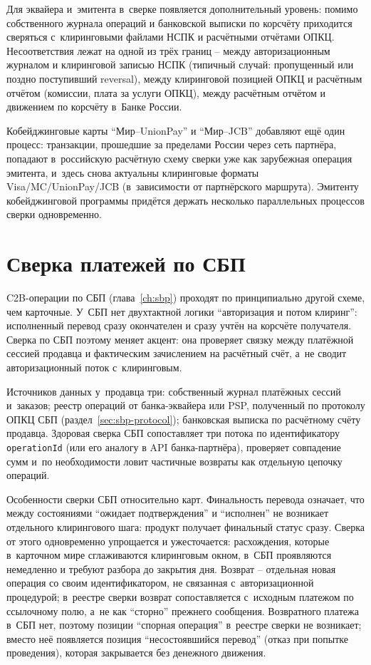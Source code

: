 Для эквайера и~эмитента в~сверке появляется
дополнительный уровень: помимо собственного журнала операций
и банковской выписки по корсчёту приходится сверяться с~клиринговыми
файлами НСПК и расчётными отчётами ОПКЦ. Несоответствия
лежат на одной из трёх границ -- между авторизационным
журналом и клиринговой записью НСПК (типичный случай:
пропущенный или поздно поступивший reversal), между клиринговой
позицией ОПКЦ и расчётным отчётом (комиссии, плата за услуги
ОПКЦ), между расчётным отчётом и движением по корсчёту
в~Банке России.

Кобейджинговые карты \enquote{Мир--UnionPay} и \enquote{Мир--JCB}
добавляют ещё один процесс: транзакции, прошедшие за пределами
России через сеть партнёра, попадают в~российскую расчётную схему
сверки уже как зарубежная операция эмитента, и~здесь снова
актуальны клиринговые форматы Visa/MC/UnionPay/JCB
(в~зависимости от партнёрского маршрута). Эмитенту
кобейджинговой программы придётся держать несколько
параллельных процессов сверки одновременно.

\section{Сверка платежей по СБП}\label{sec:recon-sbp}

C2B-операции по СБП (глава~\ref{ch:sbp}) проходят по принципиально
другой схеме, чем карточные. У~СБП нет двухтактной логики
\enquote{авторизация и потом клиринг}: исполненный перевод
сразу окончателен и сразу учтён на корсчёте получателя.
Сверка по СБП поэтому меняет акцент: она проверяет связку
между платёжной сессией продавца и фактическим зачислением
на расчётный счёт, а~не сводит авторизационный поток
с~клиринговым.

Источников данных у~продавца три: собственный журнал платёжных
сессий и~заказов; реестр операций от банка-эквайера или PSP,
полученный по протоколу ОПКЦ СБП (раздел~\ref{sec:sbp-protocol});
банковская выписка по расчётному счёту продавца. Здоровая
сверка СБП сопоставляет три потока по идентификатору
\texttt{operationId} (или его аналогу в API банка-партнёра),
проверяет совпадение сумм и~по необходимости ловит частичные
возвраты как отдельную цепочку операций.

Особенности сверки СБП относительно карт.
Финальность перевода означает, что между состояниями
\enquote{ожидает подтверждения} и \enquote{исполнен}
не возникает отдельного клирингового шага: продукт получает
финальный статус сразу. Сверка от этого одновременно
упрощается и ужесточается: расхождения, которые в~карточном мире
сглаживаются клиринговым окном, в~СБП проявляются немедленно
и требуют разбора до закрытия дня. Возврат -- отдельная
новая операция со своим идентификатором, не связанная
с~авторизационной процедурой; в~реестре сверки возврат
сопоставляется с~исходным платежом по ссылочному полю,
а~не как \enquote{сторно} прежнего сообщения. Возвратного платежа
в~СБП нет, поэтому позиции \enquote{спорная операция}
в~реестре сверки не возникает; вместо неё появляется
позиция \enquote{несостоявшийся перевод} (отказ при попытке
проведения), которая закрывается без денежного движения.

